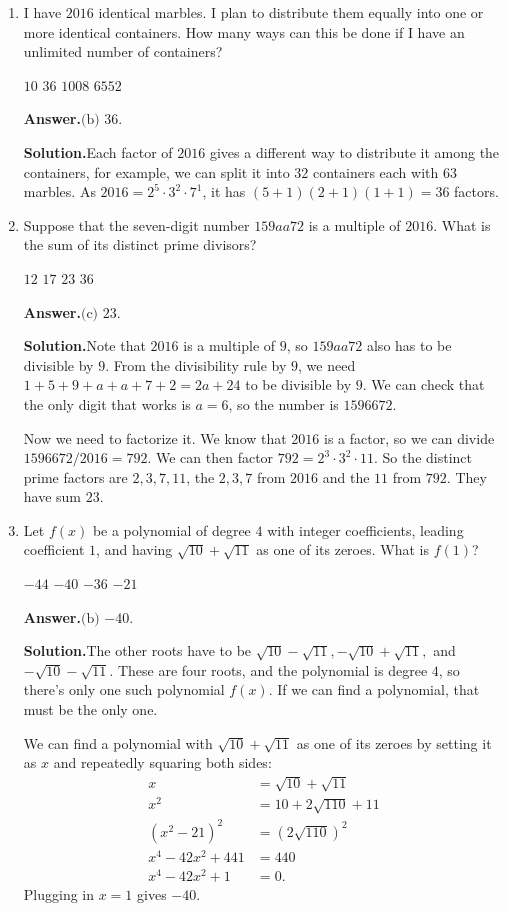 \documentclass[11pt,paper=letter]{scrartcl}
\newcommand{\ans}{{\sffamily \bfseries Answer.}\;}
\newcommand{\ansb}[2]{\ans\(\boxed{\text{(#1) #2}}\).}
\newcommand{\sol}{{\sffamily \bfseries Solution.}\;}
\begin{document}
\begin{enumerate}[left=0pt]

\item I have $2016$ identical marbles. I plan to distribute them equally into one or more identical containers. How many ways can this be done if I have an unlimited number of containers?

\fourch
{$10$}
{$36$}
{$1008$}
{$6552$}

\ansb{b}{$36$}

\sol Each factor of $2016$ gives a different way to distribute it among the containers, for example, we can split it into $32$ containers each with $63$ marbles. As $2016 = 2^5 \cdot 3^2 \cdot 7^1$, it has $(5 + 1)(2 + 1)(1 + 1) = 36$ factors.

\item Suppose that the seven-digit number $159aa72$ is a multiple of $2016$. What is the sum of its distinct prime divisors?

\fourch
{$12$}
{$17$}
{$23$}
{$36$}

\ansb{c}{$23$}

\sol Note that $2016$ is a multiple of $9$, so $159aa72$ also has to be divisible by $9$. From the divisibility rule by $9$, we need $1 + 5 + 9 + a + a + 7 + 2 = 2a + 24$ to be divisible by $9$. We can check that the only digit that works is $a = 6$, so the number is $1596672$.

Now we need to factorize it. We know that $2016$ is a factor, so we can divide $1596672/2016 = 792$. We can then factor $792 = 2^3 \cdot 3^2 \cdot 11$. So the distinct prime factors are $2, 3, 7, 11$, the $2, 3, 7$ from $2016$ and the $11$ from $792$. They have sum $23$.

\item Let $f(x)$ be a polynomial of degree $4$ with integer coefficients, leading coefficient $1$, and having $\sqrt{10} + \sqrt{11}$ as one of its zeroes. What is $f(1)$?

\fourch
{$-44$}
{$-40$}
{$-36$}
{$-21$}

\ansb{b}{$-40$}

\sol The other roots have to be $\sqrt{10} - \sqrt{11}, -\sqrt{10} + \sqrt{11},$ and $-\sqrt{10}-\sqrt{11}$. These are four roots, and the polynomial is degree $4$, so there's only one such polynomial $f(x)$. If we can find a polynomial, that must be the only one.

We can find a polynomial with $\sqrt{10} + \sqrt{11}$ as one of its zeroes by setting it as $x$ and repeatedly squaring both sides:
\begin{align*}
x &= \sqrt{10} + \sqrt{11} \\
x^2 &= 10 + 2\sqrt{110} + 11 \\
\left(x^2 - 21\right)^2 &= \left(2 \sqrt{110}\right)^2 \\
x^4 - 42x^2 + 441 &= 440 \\
x^4 - 42x^2 + 1 &= 0.
\end{align*}
Plugging in $x = 1$ gives $-40$.


\end{enumerate}
\end{document}
